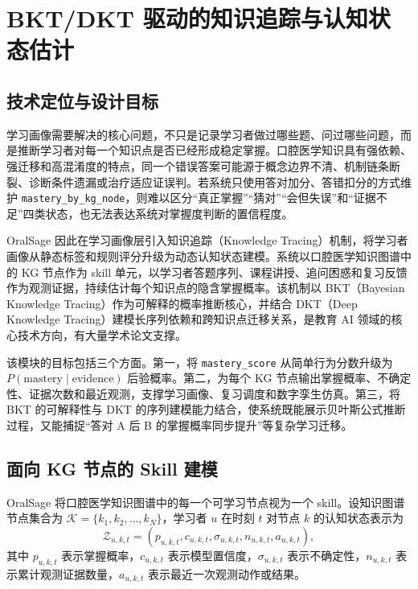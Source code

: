 
\chapter{BKT/DKT 驱动的知识追踪与认知状态估计}
\label{sec:knowledge-tracing}

\section{技术定位与设计目标}

学习画像需要解决的核心问题，不只是记录学习者做过哪些题、问过哪些问题，而是推断学习者对每一个知识点是否已经形成稳定掌握。口腔医学知识具有强依赖、强迁移和高混淆度的特点，同一个错误答案可能源于概念边界不清、机制链条断裂、诊断条件遗漏或治疗适应证误判。若系统只使用答对加分、答错扣分的方式维护 \texttt{mastery\_by\_kg\_node}，则难以区分“真正掌握”“猜对”“会但失误”和“证据不足”四类状态，也无法表达系统对掌握度判断的置信程度。

OralSage 因此在学习画像层引入知识追踪（Knowledge Tracing）机制，将学习者画像从静态标签和规则评分升级为动态认知状态建模。系统以口腔医学知识图谱中的 KG 节点作为 skill 单元，以学习者答题序列、课程讲授、追问困惑和复习反馈作为观测证据，持续估计每个知识点的隐含掌握概率。该机制以 BKT（Bayesian Knowledge Tracing）作为可解释的概率推断核心，并结合 DKT（Deep Knowledge Tracing）建模长序列依赖和跨知识点迁移关系\cite{corbett1994knowledge,piech2015deep}，是教育 AI 领域的核心技术方向，有大量学术论文支撑。

该模块的目标包括三个方面。第一，将 \texttt{mastery\_score} 从简单行为分数升级为 $P(\mathrm{mastery}\mid\mathrm{evidence})$ 后验概率。第二，为每个 KG 节点输出掌握概率、不确定性、证据次数和最近观测，支撑学习画像、复习调度和数字孪生仿真。第三，将 BKT 的可解释性与 DKT 的序列建模能力结合，使系统既能展示贝叶斯公式推断过程，又能捕捉“答对 A 后 B 的掌握概率同步提升”等复杂学习迁移。

\section{面向 KG 节点的 Skill 建模}

OralSage 将口腔医学知识图谱中的每一个可学习节点视为一个 skill。设知识图谱节点集合为 $\mathcal{K}=\{k_1,k_2,\ldots,k_N\}$，学习者 $u$ 在时刻 $t$ 对节点 $k$ 的认知状态表示为
\begin{equation}
  \mathcal{Z}_{u,k,t}=
  \left(
  p_{u,k,t},
  c_{u,k,t},
  \sigma_{u,k,t},
  n_{u,k,t},
  a_{u,k,t}
  \right),
  \label{eq:kt-state}
\end{equation}
其中 $p_{u,k,t}$ 表示掌握概率，$c_{u,k,t}$ 表示模型置信度，$\sigma_{u,k,t}$ 表示不确定性，$n_{u,k,t}$ 表示累计观测证据数量，$a_{u,k,t}$ 表示最近一次观测动作或结果。

